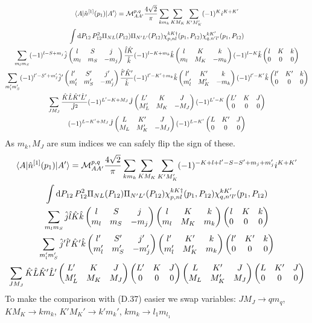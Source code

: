 \documentclass[10pt]{article}
\def\threej#1{\inthreej(#1)}
\def\inthreej(#1,#2,#3,#4,#5,#6){\begin{pmatrix}#1 & #2 & #3 \\ #4 & #5 & #6 \end{pmatrix}}
\begin{document}
\begin{multline*}
\braket{ A | \hat{n}^{[1]}(p_1) | A'} = \mathcal{M}_{A A'}^{p,q} \frac{4 \sqrt{2}}{\pi} \sum_{k m_k} \sum_{K M_K} \sum_{K' M_K'} (-1)^{K} i^{K+K'}  \\
 \int \text{d} P_{12} \, P_{12}^{2} \Pi_{N L}(P_{12}) \Pi_{N' L'}(P_{12}) \chi_{p,nl}^{kK\dagger}(p_1,P_{12}) \chi_{q,n'l'}^{kK'}(p_1,P_{12}) \\
 \sum_{m_l m_S} (-1)^{l-S+m_j} \hat{j} \threej{l,S,j,m_l,m_S,-m_j} \frac{ \hat{l} \hat{K}}{\hat{k}} (-1)^{l-K+m_k} \hat{k} \threej{l,K,k,m_l,M_K,-m_k} (-1)^{l-K} \hat{k} \threej{l,K,k,0,0,0}  \\
  \sum_{m_l' m_S'} (-1)^{l'-S'+m_j'} \hat{j}' \threej{l',S',j',m_l',m_S',-m_j'} \frac{ \hat{l}' \hat{K}'}{\hat{k}} (-1)^{l'-K'+m_k} \hat{k} \threej{l',K',k,m_l',M_K',-m_k} (-1)^{l'-K'} \hat{k} \threej{l',K',k,0,0,0}  \\
   \sum_{J M_J} \frac{ \hat{K} \hat{L} \hat{K}' \hat{L}'}{ \hat{J}^{2}} (-1)^{L'-K+M_J} \hat{J} \threej{L',K,J,M_L',M_K,-M_J} (-1)^{L'-K} \threej{L',K,J,0,0,0}  \\
   (-1)^{L-K'+M_J} \hat{J} \threej{L,K',J,M_L,M_K',-M_J} (-1)^{L-K'} \threej{L,K',J,0,0,0} 
\end{multline*}
As $m_k, M_J$ are sum indices we can safely flip the sign of these. 
\begin{multline*}
\braket{ A | \hat{n}^{[1]}(p_1) | A'} = \mathcal{M}_{A A'}^{p,q} \frac{4 \sqrt{2}}{\pi} \sum_{k m_k} \sum_{K M_K} \sum_{K' M_K'} (-1)^{-K+l+l'-S-S'+m_j+m_j'} i^{K+K'}  \\
 \int \text{d} P_{12} \, P_{12}^{2} \Pi_{N L}(P_{12}) \Pi_{N' L'}(P_{12}) \chi_{p,nl}^{kK\dagger}(p_1,P_{12}) \chi_{q,n'l'}^{kK'}(p_1,P_{12}) \\
 \sum_{m_l m_S} \hat{j} \hat{l} \hat{K} \hat{k}  \threej{l,S,j,m_l,m_S,-m_j} \threej{l,K,k,m_l,M_K,m_k}  \threej{l,K,k,0,0,0}  \\
  \sum_{m_l' m_S'} \hat{j}' \hat{l}' \hat{K}' \hat{k} \threej{l',S',j',m_l',m_S',-m_j'} \threej{l',K',k,m_l',M_K',m_k}  \threej{l',K',k,0,0,0}  \\
   \sum_{J M_J} \hat{K} \hat{L} \hat{K}' \hat{L}' \threej{L',K,J,M_L',M_K,M_J} \threej{L',K,J,0,0,0} \threej{L,K',J,M_L,M_K',M_J} \threej{L,K',J,0,0,0} 
\end{multline*}
To make the comparison with (D.37) easier we swap variables: $J M_J \rightarrow q m_q$, $K M_K \rightarrow k m_k$, $K' M_K' \rightarrow k' m_k'$, $ k m_k \rightarrow l_1 m_{l_1}$
\end{document}
